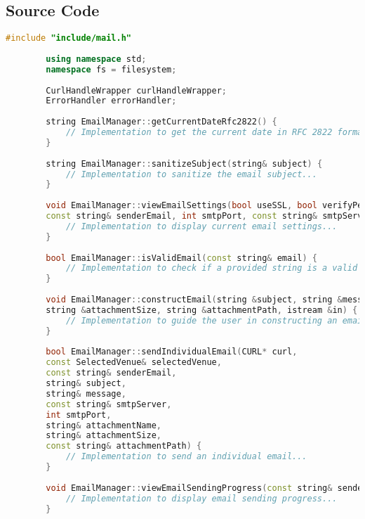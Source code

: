\documentclass{article}
\begin{document}
	\subsection*{Source Code}
	\begin{lstlisting}[language=C++]
		#include "include/mail.h"
		
		using namespace std;
		namespace fs = filesystem;
		
		CurlHandleWrapper curlHandleWrapper;
		ErrorHandler errorHandler;
		
		string EmailManager::getCurrentDateRfc2822() {
			// Implementation to get the current date in RFC 2822 format...
		}
		
		string EmailManager::sanitizeSubject(string& subject) {
			// Implementation to sanitize the email subject...
		}
		
		void EmailManager::viewEmailSettings(bool useSSL, bool verifyPeer, bool verifyHost, bool verbose,
		const string& senderEmail, int smtpPort, const string& smtpServer) {
			// Implementation to display current email settings...
		}
		
		bool EmailManager::isValidEmail(const string& email) {
			// Implementation to check if a provided string is a valid email format...
		}
		
		void EmailManager::constructEmail(string &subject, string &message, string &attachmentName, 
		string &attachmentSize, string &attachmentPath, istream &in) {
			// Implementation to guide the user in constructing an email...
		}
		
		bool EmailManager::sendIndividualEmail(CURL* curl,
		const SelectedVenue& selectedVenue,
		const string& senderEmail,
		string& subject,
		string& message,
		const string& smtpServer,
		int smtpPort,
		string& attachmentName,
		string& attachmentSize,
		const string& attachmentPath) {
			// Implementation to send an individual email...
		}
		
		void EmailManager::viewEmailSendingProgress(const string& senderEmail) {
			// Implementation to display email sending progress...
		}
	\end{lstlisting}
	
\end{document}
